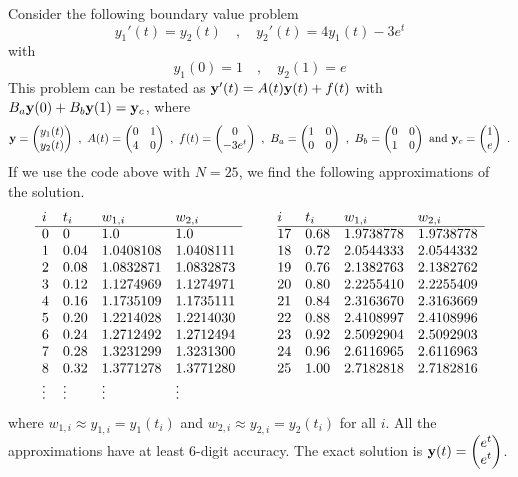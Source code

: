 \begin{egg}
Consider the following boundary value problem
\[
  y_1'(t) = y_2(t) \quad , \quad y_2'(t) = 4 y_1(t) - 3 e^t
\]
with
\[
y_1(0) = 1 \quad , \quad y_2(1) = e
\]
This problem can be restated as
$\mathbf{y}'(t) = A(t) \mathbf{y}(t) + f(t)$ with
$B_a \mathbf{y}(0) + B_b\mathbf{y}(1) = \mathbf{y}_c$, where
\[
\VEC{y} = \begin{pmatrix} y_1(t) \\ y_2(t) \end{pmatrix} \ ,
\ A(t) = \begin{pmatrix} 0 & 1 \\ 4 & 0 \end{pmatrix} \ ,
\ f(t) = \begin{pmatrix} 0 \\ -3 e^t \end{pmatrix} \ ,
\ B_a = \begin{pmatrix} 1 & 0 \\  0 & 0 \end{pmatrix} \ ,
\ B_b = \begin{pmatrix} 0 & 0 \\ 1 & 0 \end{pmatrix} \ \text{and}
\ \VEC{y}_c = \begin{pmatrix} 1 \\ e \end{pmatrix} \ .
\]
If we use the code above with $N=25$, we find the following approximations of
the solution.
\[
\begin{array}{llllc@{\hspace{2em}}llll}
i & t_i & w_{1,i} & w_{2,i} & & i & t_i & w_{1,i} & w_{2,i} \\
\cline{1-4} \cline{6-9}
0 & 0 & 1.0 & 1.0  & & 17 & 0.68 & 1.9738778 & 1.9738778 \\
1 & 0.04 & 1.0408108 & 1.0408111 & & 18 & 0.72 & 2.0544333 & 2.0544332 \\
2 & 0.08 & 1.0832871 & 1.0832873 & & 19 & 0.76 & 2.1382763 & 2.1382762 \\
3 & 0.12 & 1.1274969 & 1.1274971 & & 20 & 0.80 & 2.2255410 & 2.2255409 \\
4 & 0.16 & 1.1735109 & 1.1735111 & & 21 & 0.84 & 2.3163670 & 2.3163669 \\
5 & 0.20 & 1.2214028 & 1.2214030 & & 22 & 0.88 & 2.4108997 & 2.4108996 \\
6 & 0.24 & 1.2712492 & 1.2712494 & & 23 & 0.92 & 2.5092904 & 2.5092903 \\
7 & 0.28 & 1.3231299 & 1.3231300 & & 24 & 0.96 & 2.6116965 & 2.6116963 \\
8 & 0.32 & 1.3771278 & 1.3771280 & & 25 & 1.00 & 2.7182818 & 2.7182816 \\
\vdots & \vdots & \vdots & \vdots & & & & &
\end{array}
\]
where $w_{1,i} \approx y_{1,i} = y_1(t_i)$ and
$w_{2,i} \approx y_{2,i} = y_2(t_i)$ for all $i$.
All the approximations have at least $6$-digit accuracy.  The exact solution is
$\displaystyle \mathbf{y}(t) = \begin{pmatrix} e^t \\ e^t \end{pmatrix}$.


\end{egg}
